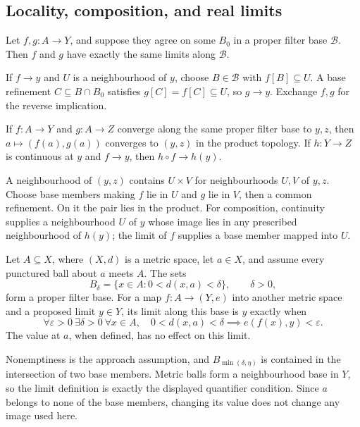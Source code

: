 \subsection{Locality, composition, and real limits}
\begin{lemma}
Let $f,g:A\to Y$, and suppose they agree on some $B_0$ in a proper
filter base $\mathcal B$. Then $f$ and $g$ have exactly the same limits
along $\mathcal B$.
\end{lemma}
\Proof
If $f\to y$ and $U$ is a neighbourhood of $y$, choose $B\in\mathcal B$
with $f[B]\subseteq U$. A base refinement $C\subseteq B\cap B_0$
satisfies $g[C]=f[C]\subseteq U$, so $g\to y$. Exchange $f,g$ for
the reverse implication.
\Done

\begin{proposition}
If $f:A\to Y$ and $g:A\to Z$ converge along the same proper filter
base to $y,z$, then $a\mapsto(f(a),g(a))$ converges to $(y,z)$ in
the product topology. If $h:Y\to Z$ is continuous at $y$ and $f\to y$,
then $h\circ f\to h(y)$.
\end{proposition}
\Proof
A neighbourhood of $(y,z)$ contains $U\times V$ for neighbourhoods
$U,V$ of $y,z$. Choose base members making $f$ lie in $U$ and $g$
lie in $V$, then a common refinement. On it the pair lies in the
product. For composition, continuity supplies a neighbourhood $U$ of
$y$ whose image lies in any prescribed neighbourhood of $h(y)$;
the limit of $f$ supplies a base member mapped into $U$.
\Done

\begin{theorem}
Let $A\subseteq X$, where $(X,d)$ is a metric space, let $a\in X$,
and assume every punctured ball about $a$ meets $A$. The sets
\[
B_\delta=\{x\in A:0<d(x,a)<\delta\},\qquad\delta>0,
\]
form a proper filter base. For a map $f:A\to(Y,e)$ into another metric
space and a proposed limit $y\in Y$, its limit along this base is $y$ exactly when
\[
\forall\varepsilon>0\ \exists\delta>0\ \forall x\in A,
\quad 0<d(x,a)<\delta\implies e(f(x),y)<\varepsilon.
\]
The value at $a$, when defined, has no effect on this limit.
\end{theorem}
\Proof
Nonemptiness is the approach assumption, and $B_{\min(\delta,\eta)}$
is contained in the intersection of two base members. Metric balls
form a neighbourhood base in $Y$, so the limit definition is exactly
the displayed quantifier condition. Since $a$ belongs to none of the
base members, changing its value does not change any image used here.
\Done

